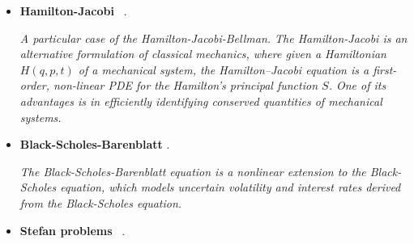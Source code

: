 \documentclass[12pt,letterpaper]{article}
\begin{document}
\begin{itemize}
\begin{itemize}
\begin{itemize}
                \textit{The Navier-Stokes equations describe the motion of viscous fluids. They describe conservation of mass and momentum and often require equations of state for pressure, temperature and density to close the system of equations.}

                $$ \partial_t \rho (x,t) + \nabla \cdot (\rho u) = 0, \frac{\partial}{\partial t}(\rho \mathbf{u})+\nabla \cdot(\rho \mathbf{u} \otimes \mathbf{u})=-\nabla p+\mu \nabla^2 \mathbf{u}+\frac{1}{3} \mu \nabla(\nabla \cdot \mathbf{u})+\rho \mathbf{g}$$
                
                \begin{itemize} 
                    \item \textbf{Incompressible} ~\cite{leongVariationalQuantumEvolution2022},  ~\cite{lapworthHybridQuantumClassicalCFD2022}.

                    \textit{The incompressible Navier-Stokes equations can be applied for low enough Mach numbers, and cannot be used to accurately simulate density or pressure waves like sound or shock waves. The fluid density is considered constant $\rho = \rho_0$.}
                \end{itemize}
    
                \item \textbf{Hamilton-Jacobi}  ~\cite{jinTimeComplexityAnalysis2022,jinQuantumAlgorithmsComputing2022}.
                
                \textit{A particular case of the Hamilton-Jacobi-Bellman. The Hamilton-Jacobi is an alternative formulation of classical mechanics, where given a Hamiltonian $H( q , p , t )$ of a mechanical system, the Hamilton–Jacobi equation is a first-order, non-linear PDE for the Hamilton's principal function $S$. One of its advantages is in efficiently identifying conserved quantities of mechanical systems.}


                \item \textbf{Black-Scholes-Barenblatt}  \cite{patelQuantumInspiredTensorNeural2022}.
                
                \textit{The Black-Scholes-Barenblatt equation is a nonlinear extension to the Black-Scholes equation, which models uncertain volatility and interest rates derived from the Black-Scholes equation.}

                \item \textbf{Stefan problems}  ~\cite{sarsengeldinHybridClassicalQuantumFramework2022}.
                

\end{itemize}
\end{itemize}
\end{itemize}
\end{document}
